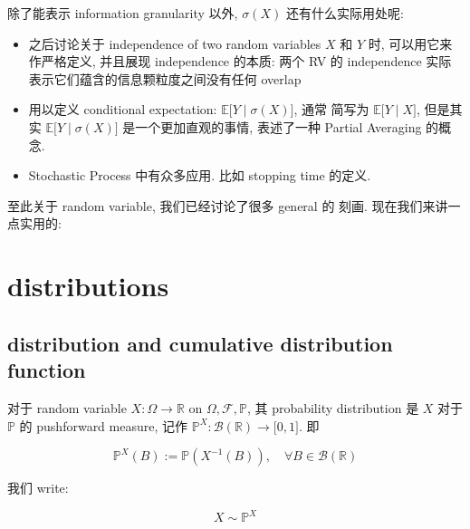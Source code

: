 除了能表示 information granularity 以外, \(\mathit{\sigma}(\mathit{X})\) 还有什么实际用处呢:

\begin{itemize}
\item
  之后讨论关于 independence of two random variables \(\mathit{X}\) 和 \(\mathit{Y}\) 时, 可以用它来作严格定义, 并且展现 independence 的本质: 两个 RV 的 independence 实际表示它们蕴含的信息颗粒度之间没有任何 overlap
\item
  用以定义 conditional expectation: \(\left. \mathbb{E}\lbrack\mathit{Y} \middle| \mathit{\sigma}(\mathit{X})\rbrack \right.\), 通常 简写为 \(\left. \mathbb{E}\lbrack\mathit{Y} \middle| \mathit{X}\rbrack \right.\), 但是其实 \(\left. \mathbb{E}\lbrack\mathit{Y} \middle| \mathit{\sigma}(\mathit{X})\rbrack \right.\) 是一个更加直观的事情, 表述了一种 Partial Averaging 的概念.
\item
  Stochastic Process 中有众多应用. 比如 stopping time 的定义.
\end{itemize}

至此关于 random variable, 我们已经讨论了很多 general 的 刻画. 现在我们来讲一点实用的:

\section{distributions}\label{distributions}

\subsection{distribution and cumulative distribution function}\label{distribution-and-cumulative-distribution-function}

\begin{definition}{}

对于 random variable \(\mathit{X}:\Omega\rightarrow\mathbb{R}\) on \(\Omega,\mathcal{F},\mathbb{P}\), 其 probability distribution 是 \(\mathit{X}\) 对于 \(\mathbb{P}\) 的 pushforward measure, 记作 \(\mathbb{P}^{\mathit{X}}:\mathcal{B}(\mathbb{R})\rightarrow\lbrack 0,1\rbrack\). 即

\[\mathbb{P}^{\mathit{X}}(\mathit{B}) := \mathbb{P}(\mathit{X}^{- 1}(\mathit{B})),\quad\forall\mathit{B} \in \mathcal{B}(\mathbb{R})\]

我们 write:

\[\mathit{X} \sim \mathbb{P}^{\mathit{X}}\]

\end{definition}

